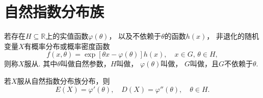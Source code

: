 \section{自然指数分布族}
\begin{definition}
若存在\(H \subseteq \mathbb{R}\)上的实值函数\(\varphi(\theta)\)，%
以及不依赖于\(\theta\)的函数\(h(x)\)，%
非退化的随机变量\(X\)有概率分布或概率密度函数\[
f(x,\theta) = \exp[\theta x - \varphi(\theta)] h(x),
\quad x \in G,\,\theta \in H,
\]则称\(X\)服从.
其中\(\theta\)叫做自然参数，\(H\)叫做，%
\(\varphi(\theta)\)叫做，%
\(G\)叫做，且\(G\)不依赖于\(\theta\).
\end{definition}

\begin{theorem}
若\(X\)服从自然指数分布族分布，则\[
E(X) = \varphi'(\theta),
\quad
D(X) = \varphi''(\theta),
\quad
\theta \in H.
\]
\end{theorem}

